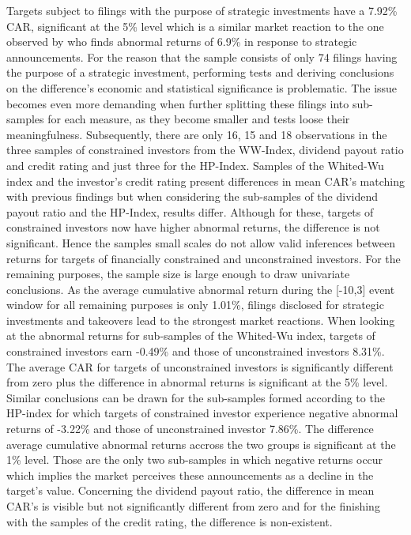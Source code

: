 \documentclass[12pt]{article}
\begin{document}
\noindent Targets subject to filings with the purpose of strategic investments have a 7.92\% CAR, significant at the 5\% level which is a similar market reaction to the one observed by \citet[p.]{Allen2000} who finds abnormal returns of 6.9\% in response to strategic announcements. For the reason that the sample consists of only 74 filings having the purpose of a strategic investment, performing tests and deriving conclusions on the difference's economic and statistical significance is problematic. The issue becomes even more demanding when further splitting these filings into sub-samples for each measure, as they become smaller and tests loose their meaningfulness. Subsequently, there are only 16, 15 and 18 observations in the three samples of constrained investors from the WW-Index, dividend payout ratio and credit rating and just three for the HP-Index. Samples of the Whited-Wu index and the investor's credit rating present differences in mean CAR's matching with previous findings but when considering the sub-samples of the dividend payout ratio and the HP-Index, results differ. Although for these, targets of constrained investors now have higher abnormal returns, the difference is not significant. Hence the samples small scales do not allow valid inferences between returns for targets of financially constrained and unconstrained investors.
For the remaining purposes, the sample size is large enough to draw univariate conclusions. As the average cumulative abnormal return during the [-10,3] event window for all remaining purposes is only 1.01\%,  filings disclosed for strategic investments and takeovers lead to the strongest market reactions. When looking at the abnormal returns for sub-samples of the Whited-Wu index, targets of constrained investors earn -0.49\% and those of unconstrained investors 8.31\%. The average CAR for targets of unconstrained investors is significantly different from zero plus the difference in abnormal returns is significant at the 5\% level. Similar conclusions can be drawn for the sub-samples formed according to the HP-index for which targets of constrained investor experience negative abnormal returns of -3.22\% and those of unconstrained investor 7.86\%. The difference average cumulative abnormal returns accross the two groups is significant at the 1\% level. Those are the only two sub-samples in which negative returns occur which implies the market perceives these announcements as a decline in the target's value.
Concerning the dividend payout ratio, the difference in mean CAR's is visible but not significantly different from zero and for the finishing with the samples of the credit rating, the difference is non-existent. 
\end{document}
